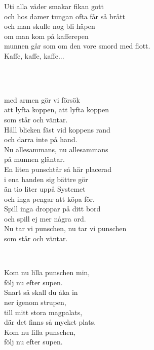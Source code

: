 Uti alla väder smakar fikan gott\\  
och hos damer tungan ofta får så brått\\  
och man skulle nog bli häpen\\  
om man kom på kafferepen\\  
munnen går som om den vore smord med flott.\\  
Kaffe, kaffe, kaffe...\\  

\newpage


 \\       

 \\
med armen gör vi försök \\
att lyfta koppen, att lyfta koppen \\
som står och väntar. \\
Håll blicken fäst vid koppens rand \\
och darra inte på hand. \\
Nu allesammans, nu allesammans\\
på munnen gläntar.\\
En liten punschtår så här placerad\\
i ena handen sig bättre gör\\
än tio liter uppå Systemet\\
och inga pengar att köpa för.\\
Spill inga droppar på ditt bord\\
och spill ej mer några ord.\\
Nu tar vi punschen, nu tar vi punschen\\
som står och väntar.\\

\newpage


 \\       

\songtext{}Kom nu lilla punschen min,\\     
följ nu efter supen.\\     
Snart så skall du åka in\\     
ner igenom strupen,\\     
till mitt stora magpalats,\\     
där det finns så mycket plats.\\     
Kom nu lilla punschen,\\     
följ nu efter supen.\\

